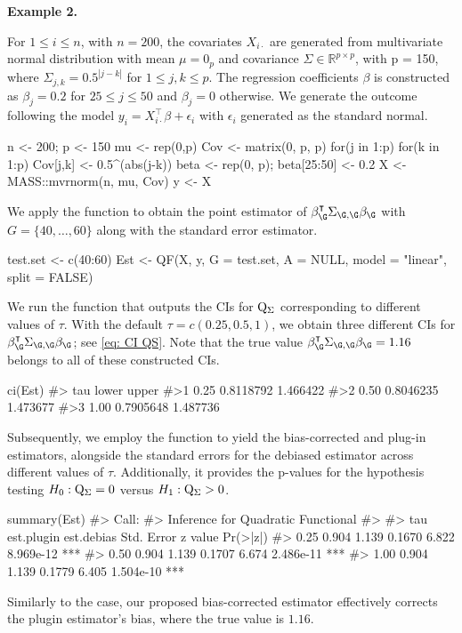 \noindent\textbf{Example 2.} {For $1\leq i\leq n$, with $n = 200$, the covariates $X_{i\cdot}$ are generated from multivariate normal distribution with mean $\mu = 0_p$ and covariance $\Sigma \in \mathbb{R}^{p \times p}$, with p = 150, where $\Sigma_{j, k} = 0.5^{|j-k|}$ for $1\leq j,k\leq p$. The regression coefficients $\beta$ is constructed as $\beta_j = 0.2$ for $25 \leq j \leq 50$ and $\beta_j = 0$ otherwise. We generate the outcome following the model $y_i = X_{i\cdot}^{\intercal}\beta + \epsilon_i$ with $\epsilon_i$ generated as the standard normal. 
\begin{example}
    n <- 200; p <- 150
    mu <- rep(0,p)
    Cov <- matrix(0, p, p)
    for(j in 1:p) for(k in 1:p) Cov[j,k] <- 0.5^(abs(j-k))
    beta <- rep(0, p); beta[25:50] <- 0.2
    X <- MASS::mvrnorm(n, mu, Cov)
    y <- X%
\end{example}
We apply the  function to obtain the point estimator of $\beta_\G^{\intercal}\Sigma_{\G,\G}\beta_\G$ with $G=\{40,\ldots,60\}$ along with the standard error estimator.
\begin{example}
    test.set <- c(40:60)
    Est <- QF(X, y, G = test.set, A = NULL, model = "linear", split = FALSE)
\end{example} 
}
{\noindent We run the function  that outputs the CIs for ${\rm Q}_{\Sigma}$ corresponding to different values of $\tau$.} With the default $\tau=c(0.25, 0.5, 1)$, we obtain three different CIs for $\beta_{\G}^{\intercal} \Sigma_{\G,\G} \beta_\G$; see \eqref{eq: CI QS}. Note that the true value $\beta_{\G}^{\intercal}\Sigma_{\G,\G}\beta_{\G} = 1.16$ belongs to all of these constructed CIs.
\begin{example}
    ci(Est)
    #>   tau     lower    upper
    #>1 0.25 0.8118792 1.466422
    #>2 0.50 0.8046235 1.473677
    #>3 1.00 0.7905648 1.487736
\end{example}
{Subsequently, we employ the  function to yield the bias-corrected and plug-in estimators, alongside the standard errors for the debiased estimator across different values of $\tau$. Additionally, it provides the p-values for the hypothesis testing $H_0 : {\rm Q}_{\Sigma} = 0$ versus $H_1 : {\rm Q}_{\Sigma} > 0$.
} 
\begin{example}
    summary(Est)
    #> Call: 
    #> Inference for Quadratic Functional
    #> 
    #>  tau est.plugin est.debias Std. Error z value  Pr(>|z|)    
    #> 0.25      0.904      1.139     0.1670   6.822 8.969e-12 ***
    #> 0.50      0.904      1.139     0.1707   6.674 2.486e-11 ***
    #> 1.00      0.904      1.139     0.1779   6.405 1.504e-10 ***
\end{example}
Similarly to the  case, our proposed bias-corrected estimator effectively corrects the plugin estimator's bias, where the true value is $1.16.$

